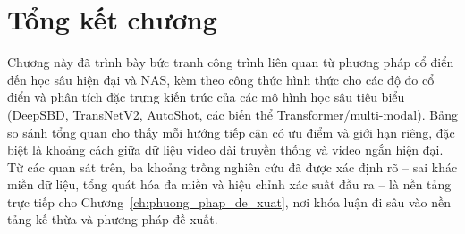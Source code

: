 \section{Tổng kết chương}
Chương này đã trình bày bức tranh công trình liên quan từ phương pháp cổ điển đến học sâu hiện đại và NAS, kèm theo công thức hình thức cho các độ đo cổ điển và phân tích đặc trưng kiến trúc của các mô hình học sâu tiêu biểu (DeepSBD, TransNetV2, AutoShot, các biến thể Transformer/multi-modal). Bảng so sánh tổng quan cho thấy mỗi hướng tiếp cận có ưu điểm và giới hạn riêng, đặc biệt là khoảng cách giữa dữ liệu video dài truyền thống và video ngắn hiện đại. Từ các quan sát trên, ba khoảng trống nghiên cứu đã được xác định rõ -- sai khác miền dữ liệu, tổng quát hóa đa miền và hiệu chỉnh xác suất đầu ra -- là nền tảng trực tiếp cho Chương~\ref{ch:phuong_phap_de_xuat}, nơi khóa luận đi sâu vào nền tảng kế thừa và phương pháp đề xuất.
